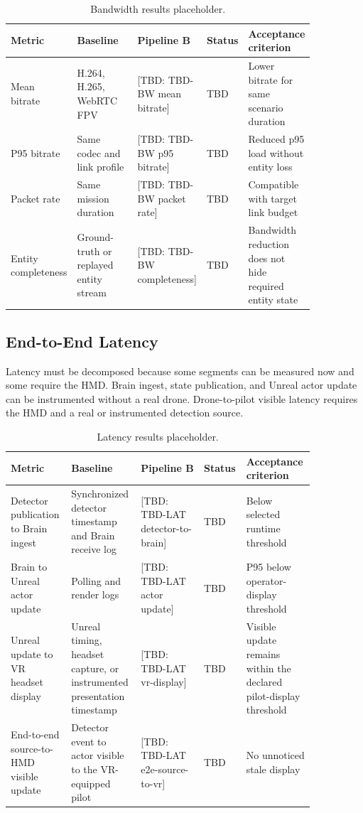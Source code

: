 \documentclass[11pt,a4paper]{article}
\newcommand{\tbd}[1]{\textcolor{publicationred}{[TBD: #1]}}
\begin{document}
\begin{table}[H]
\centering
\small
\caption{Bandwidth results placeholder.}
\label{tab:bandwidth-placeholder}
\begin{tabular}{@{}L{0.18\linewidth}L{0.21\linewidth}L{0.20\linewidth}L{0.08\linewidth}L{0.18\linewidth}@{}}
\toprule
Metric & Baseline & Pipeline B & Status & Acceptance criterion \\
\midrule
Mean bitrate & H.264, H.265, WebRTC FPV & \tbd{TBD-BW mean bitrate} & TBD & Lower bitrate for same scenario duration \\
P95 bitrate & Same codec and link profile & \tbd{TBD-BW p95 bitrate} & TBD & Reduced p95 load without entity loss \\
Packet rate & Same mission duration & \tbd{TBD-BW packet rate} & TBD & Compatible with target link budget \\
Entity completeness & Ground-truth or replayed entity stream & \tbd{TBD-BW completeness} & TBD & Bandwidth reduction does not hide required entity state \\
\bottomrule
\end{tabular}
\normalsize
\end{table}

\subsection{End-to-End Latency}

Latency must be decomposed because some segments can be measured now and some require the HMD. Brain ingest, state publication, and Unreal actor update can be instrumented without a real drone. Drone-to-pilot visible latency requires the HMD and a real or instrumented detection source.

\begin{table}[H]
\centering
\small
\caption{Latency results placeholder.}
\label{tab:latency-placeholder}
\begin{tabular}{@{}L{0.18\linewidth}L{0.21\linewidth}L{0.20\linewidth}L{0.08\linewidth}L{0.18\linewidth}@{}}
\toprule
Metric & Baseline & Pipeline B & Status & Acceptance criterion \\
\midrule
Detector publication to Brain ingest & Synchronized detector timestamp and Brain receive log & \tbd{TBD-LAT detector-to-brain} & TBD & Below selected runtime threshold \\
Brain to Unreal actor update & Polling and render logs & \tbd{TBD-LAT actor update} & TBD & P95 below operator-display threshold \\
Unreal update to VR headset display & Unreal timing, headset capture, or instrumented presentation timestamp & \tbd{TBD-LAT vr-display} & TBD & Visible update remains within the declared pilot-display threshold \\
End-to-end source-to-HMD visible update & Detector event to actor visible to the VR-equipped pilot & \tbd{TBD-LAT e2e-source-to-vr} & TBD & No unnoticed stale display \\
\bottomrule
\end{tabular}
\normalsize
\end{table}
\end{document}
